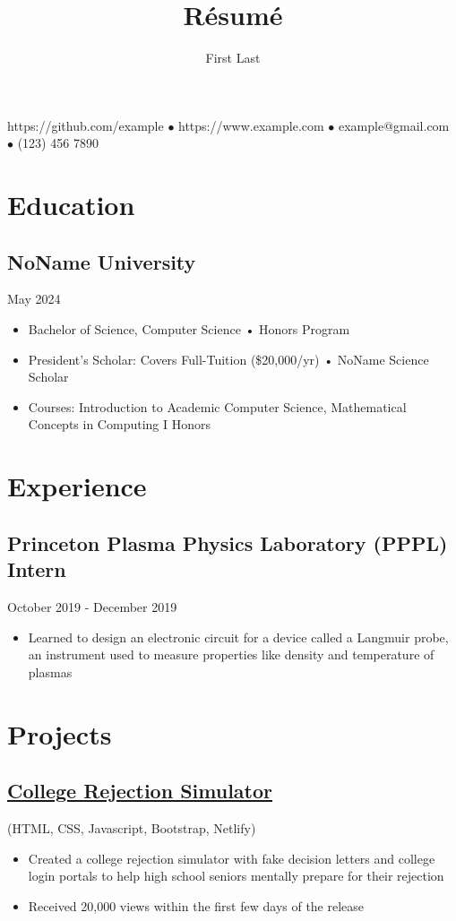 \documentclass{article}
\makeatletter
\renewcommand{\maketitle}{
    \begin{center}
        {\huge\bfseries
        \theauthor}
    \end{center}
    \begin{center}
        \vspace{1em}
        \leavevmode
        https://github.com/example $\bullet$ https://www.example.com $\bullet$ example@gmail.com $\bullet$ (123) 456 7890
    \end{center}
}
\makeatother
\begin{document}
\title{R\'esum\'e}
\author{First Last}

\maketitle
\section{Education}
\subsection{NoName University}\hspace{33em}May 2024
\begin{itemize}
    \item Bachelor of Science, Computer Science • Honors Program
    \item President's Scholar: Covers Full-Tuition (\$20,000/yr) • NoName Science Scholar
    \item Courses: Introduction to Academic Computer Science, Mathematical Concepts in Computing I Honors 
\end{itemize}

\section{Experience}
\subsection{Princeton Plasma Physics Laboratory (PPPL) Intern}\hspace{7em}October 2019 - December 2019
\begin{itemize}
    \item Learned to design an electronic circuit for a device called a Langmuir probe, an instrument used to measure properties like density and temperature of plasmas
\end{itemize}

\section{Projects}
\subsection{\href{https://ivyhub.org/decision-letters/}{College Rejection Simulator}} (HTML, CSS, Javascript, Bootstrap, Netlify)
\begin{itemize}
    \item Created a college rejection simulator with fake decision letters and college login portals to help high school seniors mentally prepare for their rejection
    \item Received 20,000 views within the first few days of the release
\end{itemize}
\end{document}
